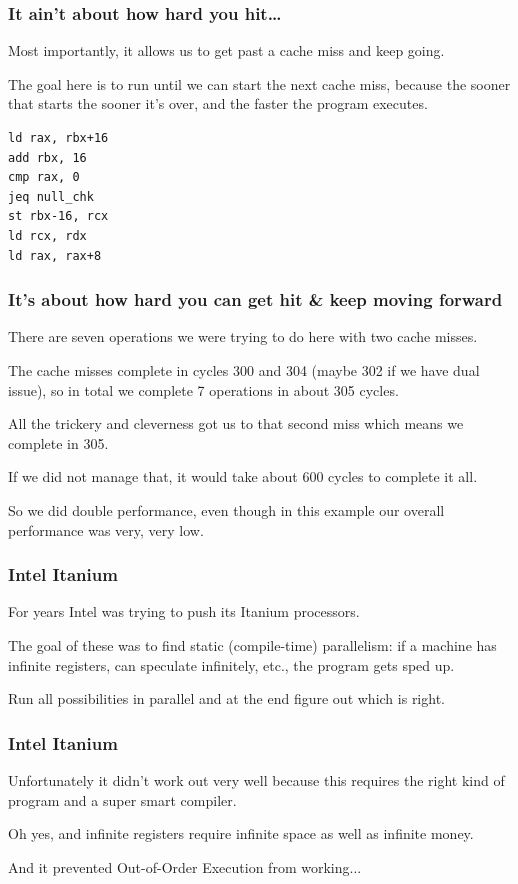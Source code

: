 \begin{frame}[fragile]
\frametitle{It ain't about how hard you hit\ldots}

Most importantly, it allows us to get past a cache miss and keep going.

The goal here is to run until we can start the next cache miss, because the sooner that starts the sooner it's over, and the faster the program executes.


\begin{verbatim}
ld rax, rbx+16
add rbx, 16
cmp rax, 0
jeq null_chk
st rbx-16, rcx
ld rcx, rdx
ld rax, rax+8
\end{verbatim}


\end{frame}



\begin{frame}
\frametitle{It's about how hard you can get hit \& keep moving forward}

There are seven operations we were trying to do here with two cache misses. 

The cache misses complete in cycles 300 and 304 (maybe 302 if we have dual issue), so in total we complete 7 operations in about 305 cycles. 

All the trickery and cleverness got us to that second miss which means we complete in 305. 

If we did not manage that, it would take about 600 cycles to complete it all. 

So we did double performance, even though in this example our overall performance was very, very low.

\end{frame}



\begin{frame}
\frametitle{Intel Itanium}

For years Intel was trying to push its Itanium processors. 

The goal of these was to find static (compile-time) parallelism: if a machine has infinite registers, can speculate infinitely, etc., the program gets sped up. 

Run all possibilities in parallel and at the end figure out which is right.

\end{frame}

\begin{frame}
\frametitle{Intel Itanium}

Unfortunately it didn't work out very well because this requires the right kind of program and a super smart compiler. 

Oh yes, and infinite registers require infinite space as well as infinite money. 

And it prevented Out-of-Order Execution from working...

\end{frame}

